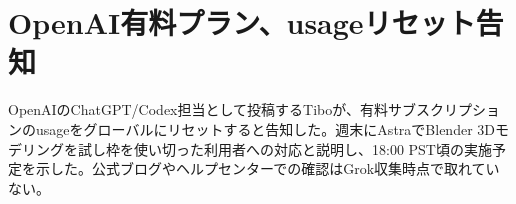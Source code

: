 \section{OpenAI有料プラン、usageリセット告知}
OpenAIのChatGPT/Codex担当として投稿するTiboが、有料サブスクリプションのusageをグローバルにリセットすると告知した。週末にAstraでBlender 3Dモデリングを試し枠を使い切った利用者への対応と説明し、18:00 PST頃の実施予定を示した。公式ブログやヘルプセンターでの確認はGrok収集時点で取れていない。
